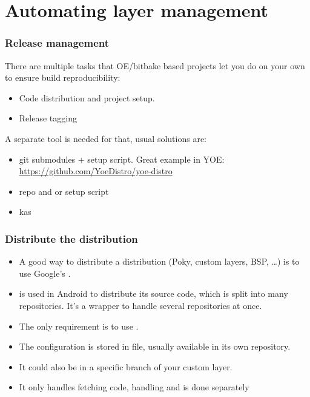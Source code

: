 \section{Automating layer management}

\begin{frame}[fragile]
  \frametitle{Release management}
  There are multiple tasks that OE/bitbake based projects let you do
  on your own to ensure build reproducibility:
  \begin{itemize}
  \item Code distribution and project setup.
  \item Release tagging
  \end{itemize}
  A separate tool is needed for that, usual solutions are:
  \begin{itemize}
  \item git submodules + setup script. Great example in YOE:
    \url{https://github.com/YoeDistro/yoe-distro}
  \item repo and  or setup script
  \item kas
  \end{itemize}
\end{frame}

\begin{frame}
  \frametitle{Distribute the distribution}
  \begin{itemize}
    \item A good way to distribute a distribution (Poky, custom
      layers, BSP, \dots) is to use Google's
      .
    \item {} is used in Android to distribute its source
      code, which is split into many  repositories. It's a
      wrapper to handle several  repositories at once.
    \item The only requirement is to use .
    \item The  configuration is stored in 
      file, usually available in its own  repository.
  \item It could also be in a specific branch of your custom layer.
  \item It only handles fetching code, handling  and
     is done separately
  \end{itemize}
\end{frame}

